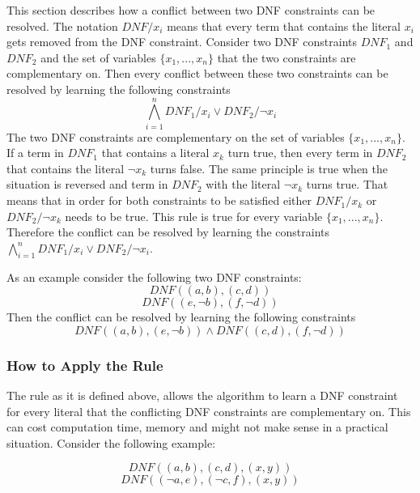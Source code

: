 \documentclass{easychair}
\begin{document}
This section describes how a conflict between two DNF constraints can be resolved. The notation $DNF/x_i$ means that every term that contains the literal $x_i$ gets removed from the DNF constraint.
Consider two DNF constraints $DNF_1$ and $DNF_2$ and the set of variables $\{x_1,...,x_n\}$ that the two constraints are complementary on. Then every conflict between these two constraints can be resolved by learning the following constraints
\begin{displaymath}
\bigwedge_{i=1}^{n} DNF_1 / x_i \vee DNF_2 / \neg x_i
\end{displaymath}
The two DNF constraints are complementary on the set of variables $\{x_1,...,x_n\}$. If a term in $DNF_1$ that contains a literal $x_k$ turn true, then every term in $DNF_2$ that contains the literal $\neg x_k$ turns false. The same principle is true when the situation is reversed and term in $DNF_2$ with the literal $\neg x_k$ turns true. That means that in order for both constraints to be satisfied either $DNF_1/x_k$ or $DNF_2/\neg x_k$ needs to be true. This rule is true for every variable $\{x_1,...,x_n\}$. Therefore the conflict can be resolved by learning the constraints $\bigwedge_{i=1}^{n} DNF_1 / x_i \vee DNF_2 / \neg x_i$.

As an example consider the following two DNF constraints:
\begin{displaymath}
DNF ((a,b),(c,d))
\end{displaymath}
\begin{displaymath}
DNF ((e,\neg b),(f,\neg d))
\end{displaymath}
Then the conflict can be resolved by learning the following constraints
\begin{displaymath}
DNF ((a,b),(e,\neg b)) \wedge DNF ((c,d),(f,\neg d))
\end{displaymath}

\subsubsection{How to Apply the Rule}

The rule as it is defined above, allows the algorithm to learn a DNF constraint for every literal that the conflicting DNF constraints are complementary on. This can cost computation time, memory and might not make sense in a practical situation. Consider the following example:

\begin{displaymath}
DNF((a,b),(c,d),(x,y))
\end{displaymath}
\begin{displaymath}
DNF((\neg a, e),(\neg c, f), (x,y))
\end{displaymath}
\end{document}
